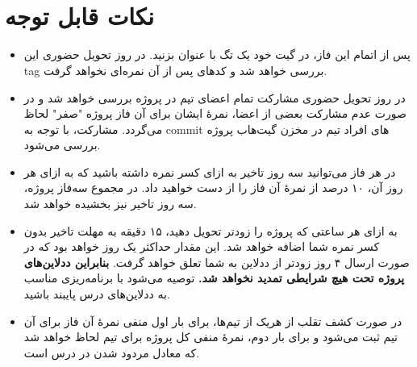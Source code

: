 \documentclass[]{article}
\begin{document}
\newpage
\pagestyle{fancy}
\fancyhf{}
\fancyfoot{}
\cfoot{\thepage}
\renewcommand{\headrulewidth}{2pt}

\KashidaOff


\tableofcontents

\newpage

 \Large \textbf{\\\\
}


\section*{{\titr نکات قابل توجه}}
\begin{itemize}
\item
پس از اتمام این فاز، در گیت خود یک تگ با عنوان  بزنید. در روز تحویل حضوری این tag بررسی خواهد شد و کدهای پس از آن نمره‌ای نخواهد گرفت.

\item
در روز تحویل حضوری مشارکت تمام اعضای تیم در پروژه بررسی خواهد‌ شد و در صورت عدم مشارکت بعضی از اعضا، نمرهٔ ایشان برای آن فاز پروژه "صفر" لحاظ می‌گردد. مشارکت، با توجه به commit های افراد تیم در مخزن گیت‌هاب پروژه بررسی می‌شود.

\item
در هر فاز می‌توانید سه روز تاخیر به ازای کسر نمره داشته‌ باشید که به ازای هر روز آن، ۱۰ درصد از نمرهٔ آن فاز را از دست خواهید‌ داد. در مجموع سه‌فاز پروژه، سه روز تاخیر نیز بخشیده خواهد‌ شد.

\item
به ازای هر ساعتی که پروژه را زودتر تحویل دهید، ۱۵ دقیقه به مهلت تاخیر بدون کسر نمره شما اضافه خواهد‌ شد. این مقدار حداکثر یک روز خواهد‌ بود که در صورت ارسال ۴ روز زودتر از ددلاین به شما تعلق خواهد گرفت. \textbf{بنابراین ددلاین‌های پروژه تحت هیچ شرایطی تمدید نخواهد‌ شد.} توصیه می‌شود با برنامه‌ریزی مناسب به ددلاین‌های درس پایبند باشید.

\item
در صورت کشف تقلب از هریک از تیم‌ها، برای بار اول منفی نمرهٔ آن فاز برای آن تیم ثبت می‌شود و برای بار دوم، نمرهٔ منفی کل پروژه برای تیم لحاظ خواهد‌ شد که معادل مردود شدن در درس است.
\end{itemize}
\end{document}
